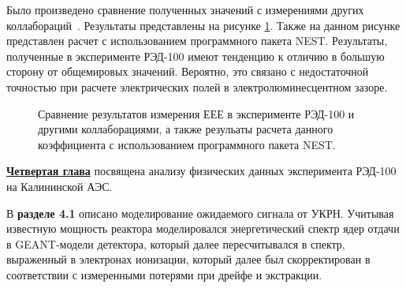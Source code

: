 Было произведено сравнение полученных значений с измерениями других коллабораций~\cite{Gouschin1978,AprileEEE_2014,Edwards_2018,PhysRevD.99.103024}. Результаты представлены на рисунке \ref{img:EEEworld}. Также на данном рисунке представлен расчет с использованием программного пакета NEST. Результаты, полученные в эксперименте РЭД-100 имеют тенденцию к отличию в большую сторону от общемировых значений. Вероятно, это связано с недостаточной точностью при расчете электрических полей в электролюминесцентном зазоре.

\begin{figure}[ht]
  \caption{Сравнение результатов измерения ЕЕЕ в эксперименте РЭД-100 и другими коллаборациями, а также резульаты расчета данного коэффициента с использованием программного пакета NEST.}
  \label{img:EEEworld}  
\end{figure}

\underline{\textbf{Четвертая глава}} посвящена анализу физических данных эксперимента РЭД-100 на Калининской АЭС. 

В \textbf{разделе 4.1} описано моделирование ожидаемого сигнала от УКРН. Учитывая известную мощность реактора моделировался энергетический спектр ядер отдачи в GEANT-модели детектора, который далее пересчитывался в спектр, выраженный в электронах ионизации, который далее был скорректирован в соответствии с измеренными потерями при дрейфе и экстракции.

